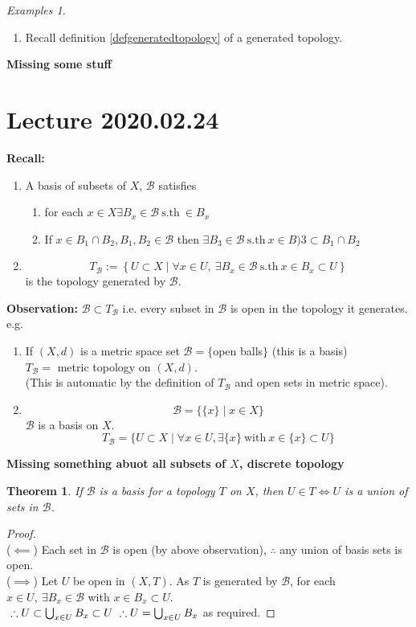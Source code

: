 \documentclass{article}
\newcommand{\sth}{\mathrm{s.th}\ }
\newcommand{\ba}{\mathcal{B}}
\newtheorem{stheorem}{Theorem}[theorem]
\theoremstyle{remark}
\theoremstyle{example}
\theoremstyle{examples}
\newtheorem*{examples}{Examples}
\begin{document}
	\begin{examples}
		\begin{enumerate}
			\item Recall definition \ref{defgeneratedtopology} of a generated topology.
		\end{enumerate}
	\end{examples}
	\textbf{Missing some stuff}
	
	\section*{Lecture 2020.02.24}
	\textbf{Recall:} \begin{enumerate}
		\item A basis of subsets of $X$, $\ba$ satisfies \begin{enumerate}
			\item for each $x \in X \exists B_x \in \ba \ \sth  \in B_x$
			\item If $x \in B_1 \cap B_2, B_1, B_2 \in \ba$ then $\exists B_3 \in \ba\ \sth x \in B)3 \subset B_1 \cap B_2$
		\end{enumerate}
		\item \[T_\ba := \left\{U \subset X \mid \forall x \in U,\ \exists B_x \in \ba \ \sth x \in B_x \subset U \right\}  \]
		is the topology generated by $\ba$.
	\end{enumerate}
	\textbf{Observation:} $\ba \subset T_\ba$ i.e. every subset in $\ba$ is open in the topology it generates.\\
	e.g. \begin{enumerate}
		\item If $(X,d)$ is a metric space set $\ba = \{$open balls$\}$ (this is a basis)\\
		$T_\ba = $ metric topology on $(X,d)$.\\
		(This is automatic by the definition of $T_\ba$ and open sets in metric space).
		\item \[\ba = \{ \{ x\} \mid x \in X  \}\]
		$\ba$ is a basis on $X$.\\
		\[T_\ba = \{U \subset X \mid \forall x \in U, \exists \{x\}\ \mathrm{with}\ x \in \{x\}\subset U\}\]
	\end{enumerate}
	\textbf{Missing something abuot all subsets of $X$, discrete topology}
	
	\begin{stheorem}
		\label{basisisunion}
		If $\ba$ is a basis for a topology $T$ on $X$, then $U \in T \iff U$ is a union of sets in $\ba$.
	\end{stheorem}
	\begin{proof}\ \\
		($\impliedby$) Each set in $\ba$ is open (by above observation), $\therefore$ any union of basis sets is open.\\
		($\implies$) Let $U$ be open in $(X,T)$. As $T$ is generated by $\ba$, for each $x \in U,\ \exists B_x \in \ba$ with $x \in B_x \subset U$.\\
		$\ \therefore U \subset \bigcup_{x \in U} B_x \subset U\\
		\ \therefore U = \bigcup_{x \in U} B_x$ as required.
	\end{proof}
\end{document}
